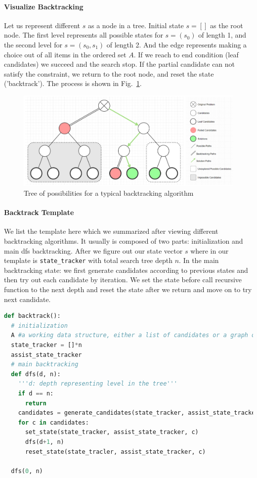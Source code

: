 \documentclass[../main.tex]{subfiles}
\begin{document}
\paragraph{Visualize Backtracking} Let us represent different $s$ as a node in a tree. Initial state $s=[]$ as the root node. The first level represents all possible states for $s=(s_0)$ of length 1, and the second level for $s=(s_0, s_1)$ of length 2. And the edge represents making a choice out of all items in the ordered set $A$. If we reach to end condition (leaf candidates) we succeed and the search stop. If the partial candidate can not satisfy the constraint, we return to the root node, and reset the state ('backtrack'). The process is shown in Fig.~\ref{fig:backtrack_tree}. 
\begin{figure}[h!]
    \centering
    \includegraphics[width=0.98\columnwidth]{fig/back_tree_possibility.png}
    \caption{Tree of possibilities for a typical backtracking algorithm}
    \label{fig:backtrack_tree}
\end{figure}

\paragraph{Backtrack Template} We list the template here which we summarized after viewing different backtracking algorithms. It usually is composed of two parts: initialization and main dfs backtracking. After we figure out our state vector $s$ where in our template is \texttt{state\_tracker} with total search tree depth $n$. In the main backtracking state: we first generate candidates according to previous states and then try out each candidate by iteration. We set the state before call recursive function to the next depth and reset the state after we return and move on to try next candidate.  
\begin{lstlisting}[language=Python]
def backtrack():
  # initialization
  A #a working data structure, either a list of candidates or a graph or a matrix representing a board
  state_tracker = []*n
  assist_state_tracker
  # main backtracking
  def dfs(d, n):
    '''d: depth representing level in the tree'''
    if d == n:
      return
    candidates = generate_candidates(state_tracker, assist_state_tracker)
    for c in candidates: 
      set_state(state_tracker, assist_state_tracker, c)
      dfs(d+1, n)
      reset_state(state_tracler, assist_state_tracker, c)
      
  dfs(0, n)
\end{lstlisting}
\end{document}
